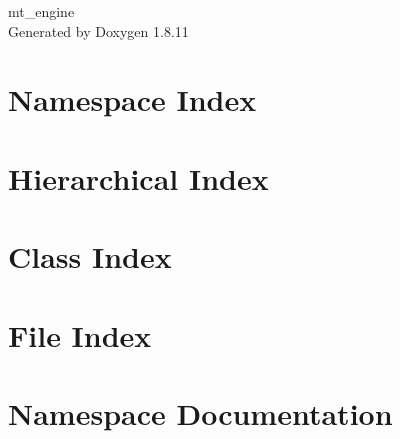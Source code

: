 \documentclass[twoside]{book}
\newcommand{\+}{\discretionary{\mbox{\scriptsize$\hookleftarrow$}}{}{}}
\newcommand{\clearemptydoublepage}{%
  \newpage{\pagestyle{empty}\cleardoublepage}%
}
\begin{document}
\hypersetup{pageanchor=false,
             bookmarksnumbered=true,
             pdfencoding=unicode
            }
\begin{titlepage}
\vspace*{7cm}
\begin{center}%
{\Large mt\+\_\+engine }\\
\vspace*{1cm}
{\large Generated by Doxygen 1.8.11}\\
\end{center}
\end{titlepage}
\clearemptydoublepage
\tableofcontents
\clearemptydoublepage
{}
\hypersetup{pageanchor=true}

\chapter{Namespace Index}

\chapter{Hierarchical Index}

\chapter{Class Index}

\chapter{File Index}

\chapter{Namespace Documentation}


\end{document}
